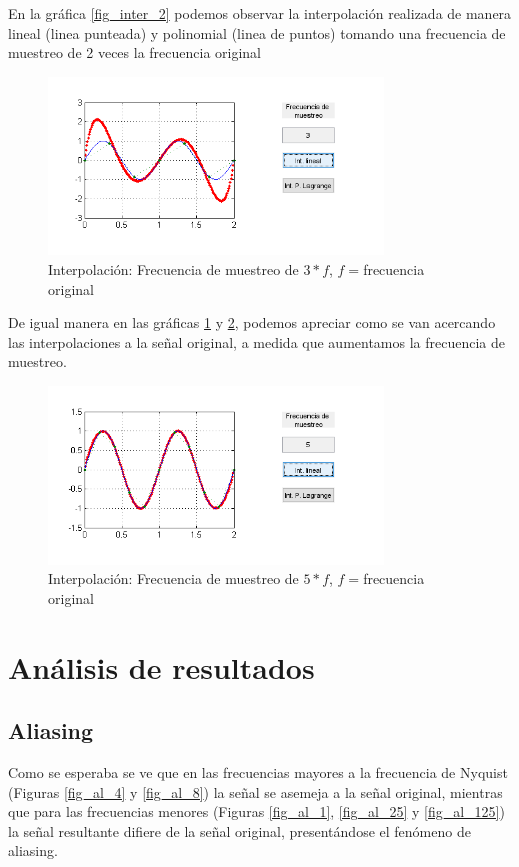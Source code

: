 \documentclass[comsoc, journal]{IEEEtran}
\begin{document}
En la gráfica \ref{fig_inter_2} podemos observar la interpolación realizada de manera lineal (linea punteada) y polinomial (linea de puntos) tomando una frecuencia de muestreo de 2 veces la frecuencia original


\begin{figure}[!t]
\centering
\includegraphics[width=3.5in]{imgs/inter3.png}
\caption{Interpolación: Frecuencia de muestreo de $3*f$, $f=$frecuencia original}
\label{fig_inter_3}
\end{figure}

De igual manera en las gráficas \ref{fig_inter_3} y \ref{fig_inter_5}, podemos apreciar como se van acercando las interpolaciones a la señal original, a medida que aumentamos la frecuencia de muestreo.


\begin{figure}[!t]
\centering
\includegraphics[width=3.5in]{imgs/inter5.png}
\caption{Interpolación: Frecuencia de muestreo de $5*f$, $f=$frecuencia original}
\label{fig_inter_5}
\end{figure}

\section{Análisis de resultados}
\subsection{Aliasing}
Como se esperaba se ve que en las frecuencias mayores a la frecuencia de Nyquist (Figuras \ref{fig_al_4} y \ref{fig_al_8}) la señal se asemeja a la señal original, mientras que para las frecuencias menores (Figuras \ref{fig_al_1}, \ref{fig_al_25} y \ref{fig_al_125}) la señal resultante difiere de la señal original, presentándose el fenómeno de aliasing.
\end{document}
